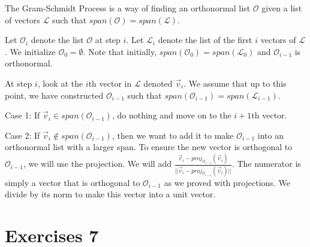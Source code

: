 \begin{definition}
    The Gram-Schmidt Process is a way of finding an orthonormal list $\mathcal{O}$ given a list of vectors $\mathcal{L}$ such that $span(\mathcal{O})=span(\mathcal{L})$.

    Let $\mathcal{O}_i$ denote the list $\mathcal{O}$ at step $i$. Let $\mathcal{L}_i$ denote the list of the first $i$ vectors of $\mathcal{L}$. We initialize $\mathcal{O}_0=\emptyset$. Note that initially, $span(\mathcal{O}_0)=span(\mathcal{L}_0)$ and $\mathcal{O}_{i-1}$ is orthonormal.

    At step $i$, look at the $i$th vector in $\mathcal{L}$ denoted $\vec{v}_i$. We assume that up to this point, we have constructed $\mathcal{O}_{i-1}$ such that $span(\mathcal{O}_{i-1})=span(\mathcal{L}_{i-1})$.

    Case 1: If $\vec{v}_i\in span(\mathcal{O}_{i-1})$, do nothing and move on to the $i+1$th vector.

    Case 2: If $\vec{v}_i\notin span(\mathcal{O}_{i-1})$, then we want to add it to make $\mathcal{O}_{i-1}$ into an orthonormal list with a larger span. To ensure the new vector is orthogonal to $\mathcal{O}_{i-1}$, we will use the projection. We will add $\frac{\vec{v}_i-proj_{\mathcal{O}_{i-1}}(\vec{v}_i)}{||\vec{v}_i-proj_{\mathcal{O}_{i-1}}(\vec{v}_i)||}$. The numerator is simply a vector that is orthogonal to $\mathcal{O}_{i-1}$ as we proved with projections. We divide by its norm to make this vector into a unit vector.
\end{definition}
\section{Exercises 7}